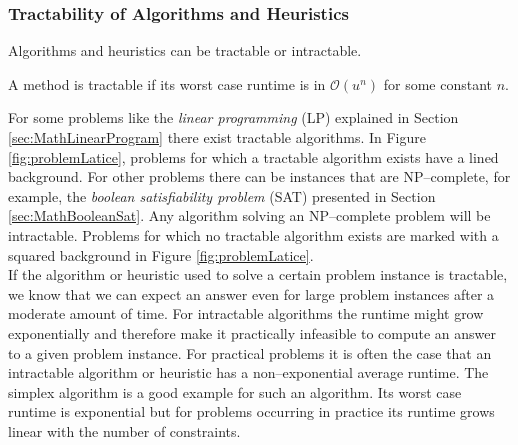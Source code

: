 \subsubsection{Tractability of Algorithms and Heuristics}
Algorithms and heuristics can be tractable or intractable. 
\begin{definition}[tractability]
A method is tractable if its worst case runtime is in $\mathcal{O}(u^n)$ for some constant $n$. 
\end{definition}
For some problems like the \emph{linear programming} (LP) explained in Section \ref{sec:MathLinearProgram} there exist tractable algorithms. In Figure \ref{fig:problemLatice}, problems for which a tractable algorithm exists have a lined background. For other problems there can be instances that are NP--complete, for example, the \emph{boolean satisfiability problem} (SAT) presented in Section \ref{sec:MathBooleanSat}. Any algorithm solving an NP--complete problem will be intractable. Problems for which no tractable algorithm exists are marked with a squared background in Figure \ref{fig:problemLatice}.\\
If the algorithm or heuristic used to solve a certain problem instance is tractable, we know that we can expect an answer even for large problem instances after a moderate amount of time. For intractable algorithms the runtime might grow exponentially and therefore make it practically infeasible to compute an answer to a given problem instance. For practical problems it is often the case that an intractable algorithm or heuristic has a non--exponential average runtime. The simplex algorithm is a good example for such an algorithm. Its worst case runtime is exponential but for problems occurring in practice its runtime grows linear with the number of constraints.
